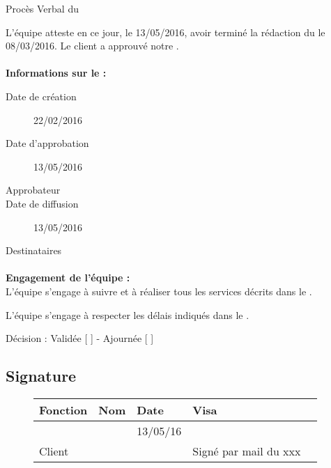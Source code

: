 \documentclass[asi, sansVersion]{picInsa}
\begin{document}
 
 \begin{center}
  \LARGE{}
    Procès Verbal du \DSE \\
 \end{center}
 
 \normalsize{}
 
L'équipe \nomEquipe{} atteste en ce jour, le 13/05/2016, avoir terminé la rédaction du \DSE le 08/03/2016.
Le client a approuvé notre \DSE.


\paragraph{}
\textbf{Informations sur le \DSECourt{} :}

\begin{description}
  \item[Date de création]22/02/2016
  \item[Date d'approbation]13/05/2016
  \item[Approbateur]\nomClient
  \item[Date de diffusion]13/05/2016
  \item[Destinataires]\nomEquipe
\end{description}

\paragraph{}
\textbf{Engagement de l'équipe :}\\


L'équipe \nomEquipe{} s'engage à suivre et à réaliser tous les services décrits dans le \DSE.


L'équipe \nomEquipe{} s'engage à respecter les délais indiqués dans le \DSE.


\begin{center}
Décision : Validée [ \checkmark{} ] - Ajournée [ ]
\end{center}

\subsection*{Signature}
\begin{figure}[H]
		\centering
		\begin{tabularx}{17cm}{|p{4cm}|X|X|X|X|}
		\hline
		\rowcolor[gray]{0.85} Fonction & Nom & Date & Visa \\
		\hline
		\CP{} & \Sergi{} & 13/05/16 & \\
		\hline
		Client & \nomClient &  & Signé par mail du xxx \\
		\hline
		\end{tabularx}
\end{figure}
\end{document}

